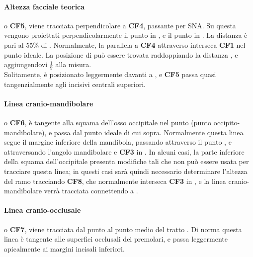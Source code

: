 \paragraph{Altezza facciale teorica} o \textbf{CF5}, viene tracciata perpendicolare a \textbf{CF4}, passante per SNA. Su questa vengono proiettati perpendicolarmente il punto  in , e il punto  in . La distanza  è pari al 55\% di . Normalmente, la parallela a \textbf{CF4} attraverso  interseca \textbf{CF1} nel punto  ideale. La posizione di  può essere trovata raddoppiando la distanza , e aggiungendovi $\frac{1}{9}$ alla misura.\\
Solitamente,  è posizionato leggermente davanti a , e \textbf{CF5} passa quasi tangenzialmente agli incisivi centrali superiori.

\paragraph{Linea cranio-mandibolare} o \textbf{CF6}, è tangente alla squama dell'osso occipitale nel punto  (punto occipito-mandibolare), e passa dal punto  ideale di cui sopra. Normalmente questa linea segue il margine inferiore della mandibola, passando attraverso il punto , e attraversando l'angolo mandibolare e \textbf{CF3} in . In alcuni casi, la parte inferiore della squama dell'occipitale presenta modifiche tali che non può essere usata per tracciare questa linea; in questi casi sarà quindi necessario determinare l'altezza del ramo tracciando \textbf{CF8}, che normalmente interseca \textbf{CF3} in , e la linea cranio-mandibolare verrà tracciata connettendo  a .


\paragraph{Linea cranio-occlusale} o \textbf{CF7}, viene tracciata dal punto  al punto medio del tratto . Di norma questa linea è tangente alle superfici occlusali dei premolari, e passa leggermente apicalmente ai margini incisali inferiori.

